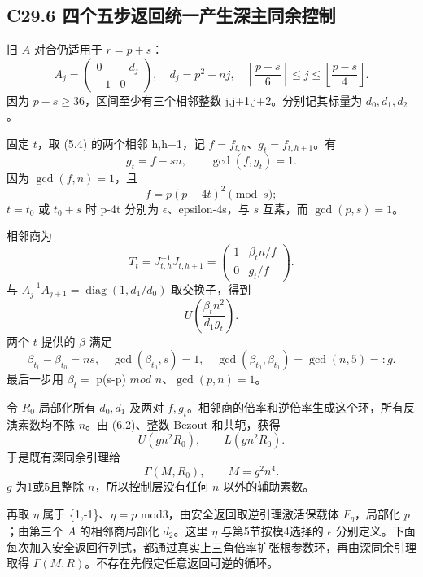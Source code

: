 \subsection*{\texorpdfstring{{C29.6} {四个五步返回统一产生深主同余控制}}{C29.6 四个五步返回统一产生深主同余控制}}\label{C29-h189}

{旧} {\ensuremath{A}} {对合仍适用于} {\ensuremath{r=p+s}：} \[
A_j=\begin{pmatrix}0&-d_j\\-1&0\end{pmatrix},
\quad d_j=p^2-nj,
\quad
\left\lceil\frac{p-s}{6}\right\rceil\le j\le
\left\lfloor\frac{p-s}{4}\right\rfloor.
\] {因为} {\ensuremath{p-s\ge 36}，区间至少有三个相邻整数} {j,j+1,j+2。分别记其标量为} {\ensuremath{d_{0},d_{1},d_{2}}。}

{固定} {\ensuremath{t}，取} {(5.4)} {的两个相邻} {h,h+1，记} {\ensuremath{f=f_{t,h}}、\ensuremath{g_{t}=f_{t,h+1}}。有} \[
g_t=f-sn,\qquad \gcd(f,g_t)=1.
\tag{C29.6.1}
\] {因为} {\ensuremath{\operatorname{gcd}(f,n)=1}，且} \[
f=p(p-4t)^2\pmod s;
\] {\ensuremath{t=t_{0}}} {或} {\ensuremath{t_{0}+s}} {时} {p-4t} {分别为} {\ensuremath{\epsilon }、epsilon-4s，与} {\ensuremath{s}} {互素，而} {\ensuremath{\operatorname{gcd}(p,s)=1}。}

{相邻商为} \[
T_t=J_{t,h}^{-1}J_{t,h+1}
=\begin{pmatrix}1&\beta_t n/f\\0&g_t/f\end{pmatrix}.
\] {与} {\ensuremath{A_{j}^{-1}A_{j+1}=\operatorname{diag}(1,d_{1}/d_{0})}} {取交换子，得到} \[
U\left(\frac{\beta_t n^2}{d_1g_t}\right).
\tag{C29.6.2}
\] {两个} {\ensuremath{t}} {提供的} {\ensuremath{\beta }} {满足} \[
\beta_{t_1}-\beta_{t_0}=ns,\quad
\gcd(\beta_{t_0},s)=1,\quad
\boxed{\gcd(\beta_{t_0},\beta_{t_1})=\gcd(n,5)=:g.}
\tag{C29.6.3}
\] {最后一步用} {\ensuremath{\beta _{t}=}} {p(s-p)} {\ensuremath{mod}} {\ensuremath{n}、\ensuremath{\operatorname{gcd}(p,n)=1}。}

{令} {\ensuremath{R_{0}}} {局部化所有} {\ensuremath{d_{0},d_{1}}} {及两对} {\ensuremath{f,g_{t}}。相邻商的倍率和逆倍率生成这个环，所有反演素数均不除} {\ensuremath{n}。由} {(6.2)、整数} {Bezout} {和共轭，获得} \[
U(gn^2R_0),\qquad L(gn^2R_0).
\] {于是既有深同余引理给} \[
\boxed{\Gamma(M,R_0),\qquad M=g^2n^4.}
\tag{C29.6.4}
\] {\ensuremath{g}} {为1或5且整除} {\ensuremath{n}，所以控制层没有任何} {\ensuremath{n}} {以外的辅助素数。}

{再取} {\ensuremath{\eta }} {属于} {\{1,-1\}、\ensuremath{\eta =p}} {mod3，由安全返回取逆引理激活保载体} {\ensuremath{F_\eta }，局部化} {\ensuremath{p}；由第三个} {\ensuremath{A}} {的相邻商局部化} {\ensuremath{d_{2}}。这里} {\ensuremath{\eta }} {与第5节按模4选择的} {\ensuremath{\epsilon }} {分别定义。下面每次加入安全返回行列式，都通过真实上三角倍率扩张根参数环，再由深同余引理取得} {\ensuremath{\Gamma (M,R)}。不存在先假定任意返回可逆的循环。}

